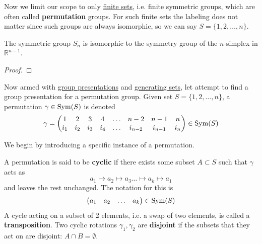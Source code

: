   Now we limit our scope to only \hyperref[st-def:finite-set]{finite sets}, i.e. finite symmetric groups, which are often called \textbf{permutation} groups. For such finite sets the labeling does not matter since such groups are always isomorphic, so we can say $S = \{1, 2, \ldots, n\}$.

  \begin{theorem}
    \label{thm:symmetric-group-as-a-symmetry-group}
    The symmetric group $S_n$ is isomorphic to the symmetry group of the $n$-simplex in $\mathbb{R}^{n-1}$. 
  \end{theorem}
  \begin{proof}
    
  \end{proof}

  Now armed with \hyperref[def:group-presentations]{group presentations} and \hyperref[def:generating-set]{generating sets}, let attempt to find a group presentation for a permutation group. Given set $S = \{1, 2, \ldots, n\}$, a permutation $\gamma \in \operatorname{Sym}(S)$ is denoted 
  \begin{equation}
    \gamma = \begin{pmatrix} 
      1 & 2 & 3 & 4 & \ldots & n-2 & n-1 & n \\ 
      i_1 & i_2 & i_3 & i_4 & \ldots & i_{n-2} & i_{n-1} & i_n 
    \end{pmatrix} \in \operatorname{Sym}(S)
  \end{equation} 

  We begin by introducing a specific instance of a permutation. 

  \begin{definition}
    \label{def:cyclic-permutation}
    A permutation is said to be \textbf{cyclic} if there exists some subset $A \subset S$ such that $\gamma$ acts as 
    \begin{equation}
      a_1 \mapsto a_2 \mapsto a_3 \ldots \mapsto a_k \mapsto a_1
    \end{equation}
    and leaves the rest unchanged. The notation for this is 
    \begin{equation}
      \begin{pmatrix} a_1 & a_2 & \ldots & a_k \end{pmatrix} \in \operatorname{Sym}(S)
    \end{equation}
    A cycle acting on a subset of 2 elements, i.e. a swap of two elements, is called a \textbf{transposition}. Two cyclic rotations $\gamma_1, \gamma_2$ are \textbf{disjoint} if the subsets that they act on are disjoint: $A \cap B = \emptyset$. 
  \end{definition}

